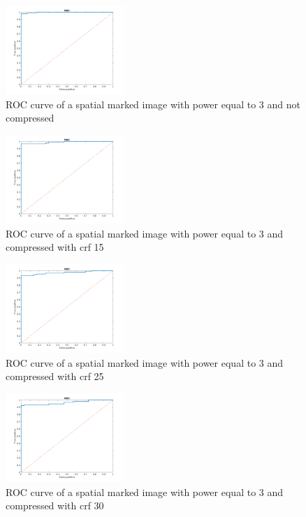 \begin{figure}[h!]
\centering
\includegraphics[width=0.4\textwidth]{./img/ROC/ROC_gauss_3_1.png}
\caption{\small{ROC curve of a spatial marked image with power equal to 3 and not compressed }}
\label{fig:g3crf1}
\end{figure}
\begin{figure}[h!]
\centering
\includegraphics[width=0.4\textwidth]{./img/ROC/ROC_gauss_3_15.png}
\caption{\small{ROC curve of a spatial marked image with power equal to 3 and compressed with crf 15 }}
\label{fig:g3crf15}
\end{figure}
\begin{figure}[h!]
\centering
\includegraphics[width=0.4\textwidth]{./img/ROC/ROC_gauss_3_25.png}
\caption{\small{ROC curve of a spatial marked image with power equal to 3 and compressed with crf 25 }}
\label{fig:g3crf25}
\end{figure}
\begin{figure}[h!]
\centering
\includegraphics[width=0.4\textwidth]{./img/ROC/ROC_gauss_3_30.png}
\caption{\small{ROC curve of a spatial marked image with power equal to 3 and compressed with crf 30 }}
\label{fig:g3crf30}
\end{figure}
\clearpage

